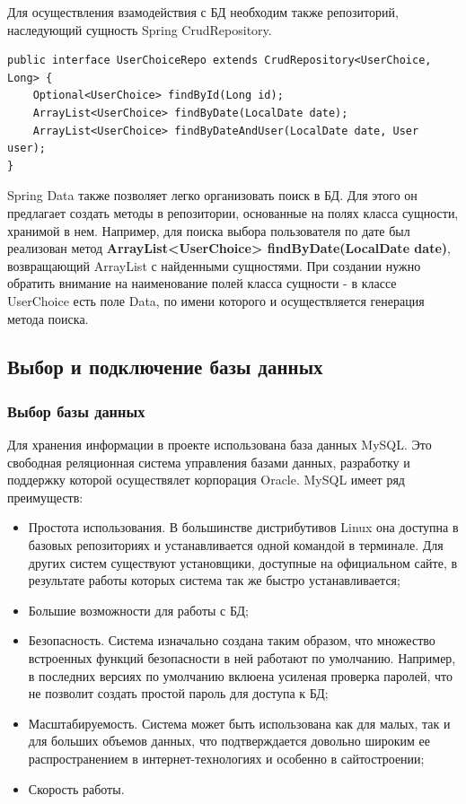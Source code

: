 \documentclass[a4paper]{article}
\begin{document}
Для осуществления взамодействия с БД необходим также репозиторий, наследующий сущность Spring CrudRepository.
\hfill\break
{}         
\begin{lstlisting}[label=lis3,caption=Репозиторий сущностей <<Выбор пользователя>>] 
public interface UserChoiceRepo extends CrudRepository<UserChoice, Long> {
    Optional<UserChoice> findById(Long id);
    ArrayList<UserChoice> findByDate(LocalDate date);
    ArrayList<UserChoice> findByDateAndUser(LocalDate date, User user);
}
\end{lstlisting}

Spring Data также позволяет легко организовать поиск в БД. Для этого он предлагает создать методы в репозитории, основанные на полях класса сущности, хранимой в нем. Например, для поиска выбора пользователя по дате был реализован метод \textbf{ArrayList<UserChoice> findByDate(LocalDate date)}, возвращающий ArrayList с найденными сущностями. При создании нужно обратить внимание на наименование полей класса сущности - в классе UserChoice есть поле Data, по имени которого и осуществляется генерация метода поиска.

\subsection{Выбор и подключение базы данных}
\subsubsection{Выбор базы данных}

Для хранения информации в проекте использована база данных MySQL. Это свободная реляционная система управления базами данных, разработку и поддержку которой осуществялет корпорация Oracle. 
MySQL имеет ряд преимуществ:

\begin{itemize}
\setlength{\itemsep}{-2mm}
	\item Простота использования. В большинстве дистрибутивов Linux она доступна в базовых репозиториях и устанавливается одной командой в терминале. Для других систем существуют установщики, доступные на официальном сайте, в результате работы которых система так же быстро устанавливается;
	\item Большие возможности для работы с БД;
	\item Безопасность. Система изначально создана таким образом, что множество
встроенных функций безопасности в ней работают по умолчанию. Например, в последних версиях по умолчанию вклюена усиленая проверка паролей, что не позволит создать простой пароль для доступа к БД;
	\item Масштабируемость. Система может быть использована как для малых, так и для больших объемов данных, что подтверждается довольно широким ее распространением в интернет-технологиях и особенно в сайтостроении;
	\item Скорость работы.
\end{itemize}
\end{document}
